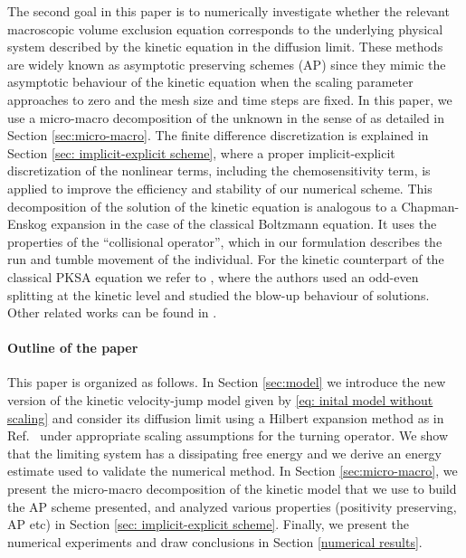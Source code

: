 \documentclass{article}
\begin{document}
The second goal in this paper is to numerically investigate whether the relevant macroscopic volume exclusion equation corresponds to the underlying physical system described by the kinetic equation {in the diffusion limit}. These methods are widely known as asymptotic preserving schemes (AP) \cite{filbet2010class,jin1999efficient} since they mimic the asymptotic behaviour of the kinetic equation when the scaling parameter approaches to zero and the mesh size and time steps are fixed. In this paper, we use a micro-macro decomposition of the unknown in the sense of  \cite{LemouMieussens} as detailed in Section \ref{sec:micro-macro}. {The finite difference discretization is explained in Section  \ref{sec: implicit-explicit scheme}, where a proper implicit-explicit discretization of the nonlinear terms, including the chemosensitivity term, is applied to improve the efficiency and stability of our numerical scheme.} This decomposition of the solution of the kinetic equation is analogous to a Chapman-Enskog expansion in the case of the classical Boltzmann equation. It uses the properties of the ``collisional operator'', which in our formulation describes the run and tumble movement of the individual. For the kinetic counterpart of the classical PKSA equation we refer to \cite{carrillo2013asymptotic}, where the authors used an odd-even splitting at the kinetic level and studied {the blow-up behaviour of solutions.}
Other related works can be found in \cite{emako2016well,wang2019asymptotic,jin2011class,chertock2019high}. 

\paragraph{Outline of the paper} This paper is organized as follows. In Section \ref{sec:model} we {introduce the new version of the kinetic velocity-jump model given by \eqref{eq: inital model without scaling}} and consider its diffusion limit using a Hilbert expansion method as in Ref.~\cite{othmer2002diffusion} under appropriate scaling assumptions for the turning operator. We show that the limiting system has a dissipating free energy and we derive an energy estimate used to validate the numerical method. {In Section \ref{sec:micro-macro}, we present the micro-macro decomposition of the kinetic model that we use to build the AP scheme presented, and analyzed various properties (positivity preserving, AP etc) in Section \ref{sec: implicit-explicit scheme}.} Finally, we present the numerical experiments and draw conclusions in Section \ref{numerical results}. 
\end{document}
